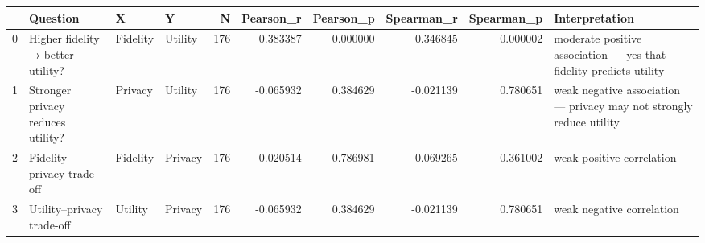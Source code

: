 \begin{tabular}{llllrrrrrl}
\toprule
 & Question & X & Y & N & Pearson_r & Pearson_p & Spearman_r & Spearman_p & Interpretation \\
\midrule
0 & Higher fidelity → better utility? & Fidelity & Utility & 176 & 0.383387 & 0.000000 & 0.346845 & 0.000002 & moderate positive association — yes that fidelity predicts utility \\
1 & Stronger privacy reduces utility? & Privacy & Utility & 176 & -0.065932 & 0.384629 & -0.021139 & 0.780651 & weak negative association — privacy may not strongly reduce utility \\
2 & Fidelity–privacy trade-off & Fidelity & Privacy & 176 & 0.020514 & 0.786981 & 0.069265 & 0.361002 & weak positive correlation \\
3 & Utility–privacy trade-off & Utility & Privacy & 176 & -0.065932 & 0.384629 & -0.021139 & 0.780651 & weak negative correlation \\
\bottomrule
\end{tabular}
